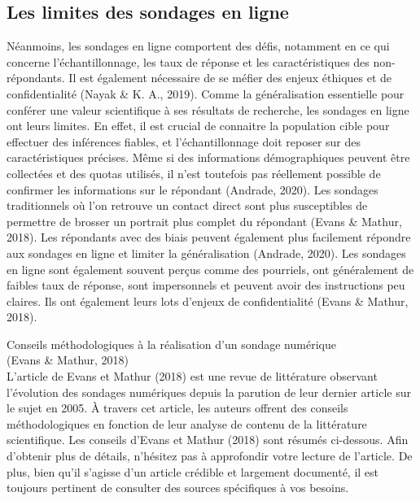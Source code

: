 \documentclass[
  letterpaper,
]{scrbook}
\begin{document}
\hypertarget{les-limites-des-sondages-en-ligne}{%
\subsection{Les limites des sondages en
ligne}\label{les-limites-des-sondages-en-ligne}}

\hfill\break
Néanmoins, les sondages en ligne comportent des défis, notamment en ce
qui concerne l'échantillonnage, les taux de réponse et les
caractéristiques des non-répondants. Il est également nécessaire de se
méfier des enjeux éthiques et de confidentialité (Nayak \& K. A., 2019).
Comme la généralisation essentielle pour conférer une valeur
scientifique à ses résultats de recherche, les sondages en ligne ont
leurs limites. En effet, il est crucial de connaitre la population cible
pour effectuer des inférences fiables, et l'échantillonnage doit reposer
sur des caractéristiques précises. Même si des informations
démographiques peuvent être collectées et des quotas utilisés, il n'est
toutefois pas réellement possible de confirmer les informations sur le
répondant (Andrade, 2020). Les sondages traditionnels où l'on retrouve
un contact direct sont plus susceptibles de permettre de brosser un
portrait plus complet du répondant (Evans \& Mathur, 2018). Les
répondants avec des biais peuvent également plus facilement répondre aux
sondages en ligne et limiter la généralisation (Andrade, 2020). Les
sondages en ligne sont également souvent perçus comme des pourriels, ont
généralement de faibles taux de réponse, sont impersonnels et peuvent
avoir des instructions peu claires. Ils ont également leurs lots
d'enjeux de confidentialité (Evans \& Mathur, 2018).

\hfill\break
Conseils méthodologiques à la réalisation d'un sondage numérique\\
(Evans \& Mathur, 2018)\\
L'article de Evans et Mathur (2018) est une revue de littérature
observant l'évolution des sondages numériques depuis la parution de leur
dernier article sur le sujet en 2005. À travers cet article, les auteurs
offrent des conseils méthodologiques en fonction de leur analyse de
contenu de la littérature scientifique. Les conseils d'Evans et Mathur
(2018) sont résumés ci-dessous. Afin d'obtenir plus de détails,
n'hésitez pas à approfondir votre lecture de l'article. De plus, bien
qu'il s'agisse d'un article crédible et largement documenté, il est
toujours pertinent de consulter des sources spécifiques à vos besoins.
\end{document}
